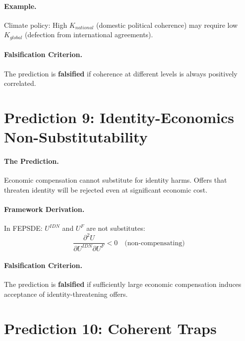 \paragraph{Example.}
Climate policy: High $K_{national}$ (domestic political coherence) may require low $K_{global}$ (defection from international agreements).

\paragraph{Falsification Criterion.}
The prediction is \textbf{falsified} if coherence at different levels is always positively correlated.


\section{Prediction 9: Identity-Economics Non-Substitutability}
\label{sec:S-prediction9}

\paragraph{The Prediction.}
Economic compensation cannot substitute for identity harms. Offers that threaten identity will be rejected even at significant economic cost.

\paragraph{Framework Derivation.}
In FEPSDE: $U^{IDN}$ and $U^F$ are not substitutes:
\begin{equation}
    \frac{\partial^2 U}{\partial U^{IDN} \partial U^F} < 0 \quad \text{(non-compensating)}
\end{equation}

\paragraph{Falsification Criterion.}
The prediction is \textbf{falsified} if sufficiently large economic compensation induces acceptance of identity-threatening offers.


\section{Prediction 10: Coherent Traps}
\label{sec:S-prediction10}

